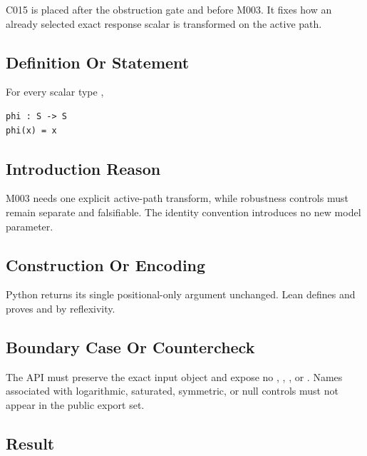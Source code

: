C015 is placed after the obstruction gate and before M003. It fixes how
an already selected exact response scalar is transformed on the active
path.

\subsection{Definition Or Statement}\label{definition-or-statement-5}

For every scalar type \texttt{\protect{}},

\begin{verbatim}
phi : S -> S
phi(x) = x
\end{verbatim}

\subsection{Introduction Reason}\label{introduction-reason-22}

M003 needs one explicit active-path transform, while robustness controls
must remain separate and falsifiable. The identity convention introduces
no new model parameter.

\subsection{Construction Or Encoding}\label{construction-or-encoding-5}

Python returns its single positional-only argument unchanged. Lean
defines \texttt{\protect{}} and proves \texttt{\protect{}} and
\texttt{\protect{}} by reflexivity.

\subsection{Boundary Case Or
Countercheck}\label{boundary-case-or-countercheck-5}

The API must preserve the exact input object and expose no
\texttt{\protect{}}, \texttt{\protect{}}, \texttt{\protect{}}, or \texttt{\protect{}}.
Names associated with logarithmic, saturated, symmetric, or null
controls must not appear in the public export set.

\subsection{Result}\label{result-22}

